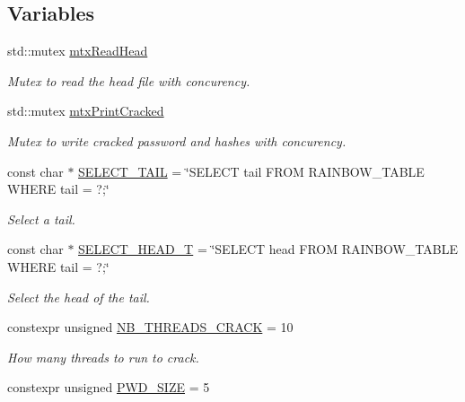 \subsection*{Variables}
\begin{DoxyCompactItemize}
\item 
std\+::mutex \hyperlink{namespacebe_1_1esi_1_1secl_1_1pn_ad1391e7f8a94f1b945665f76d1965070}{mtx\+Read\+Head}
\begin{DoxyCompactList}\small\item\em Mutex to read the head file with concurency. \end{DoxyCompactList}\item 
std\+::mutex \hyperlink{namespacebe_1_1esi_1_1secl_1_1pn_a11fbbf54ca476439788d44d4d50512ab}{mtx\+Print\+Cracked}
\begin{DoxyCompactList}\small\item\em Mutex to write cracked password and hashes with concurency. \end{DoxyCompactList}\item 
const char $\ast$ \hyperlink{namespacebe_1_1esi_1_1secl_1_1pn_a878205e4dbef8040fb12f6afb8717fa9}{S\+E\+L\+E\+C\+T\+\_\+\+T\+A\+IL} = \char`\"{}S\+E\+L\+E\+CT tail F\+R\+OM R\+A\+I\+N\+B\+O\+W\+\_\+\+T\+A\+B\+LE W\+H\+E\+RE tail = ?;\char`\"{}
\begin{DoxyCompactList}\small\item\em Select a tail. \end{DoxyCompactList}\item 
const char $\ast$ \hyperlink{namespacebe_1_1esi_1_1secl_1_1pn_ab810bcd28166c035387027aa61e02959}{S\+E\+L\+E\+C\+T\+\_\+\+H\+E\+A\+D\+\_\+T} = \char`\"{}S\+E\+L\+E\+CT head F\+R\+OM R\+A\+I\+N\+B\+O\+W\+\_\+\+T\+A\+B\+LE W\+H\+E\+RE tail = ?;\char`\"{}
\begin{DoxyCompactList}\small\item\em Select the head of the tail. \end{DoxyCompactList}\item 
constexpr unsigned \hyperlink{namespacebe_1_1esi_1_1secl_1_1pn_a02b85f534481ad3066012cb29fa8707f}{N\+B\+\_\+\+T\+H\+R\+E\+A\+D\+S\+\_\+\+C\+R\+A\+CK} = 10
\begin{DoxyCompactList}\small\item\em How many threads to run to crack. \end{DoxyCompactList}\item 
constexpr unsigned \hyperlink{namespacebe_1_1esi_1_1secl_1_1pn_a233e474af3fb15b935a71709407307ec}{P\+W\+D\+\_\+\+S\+I\+ZE} = 5

\end{DoxyCompactItemize}
